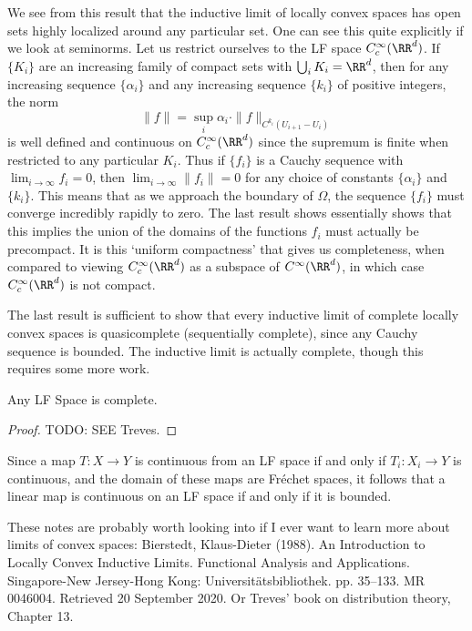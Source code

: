 \begin{remark}
    We see from this result that the inductive limit of locally convex spaces has open sets highly localized around any particular set. One can see this quite explicitly if we look at seminorms. Let us restrict ourselves to the LF space $C_c^\infty(\RR^d)$. If $\{ K_i \}$ are an increasing family of compact sets with $\bigcup_i K_i = \RR^d$, then for any increasing sequence $\{ \alpha_i \}$ and any increasing sequence $\{ k_i \}$ of positive integers, the norm
    \[ \| f \| = \sup_i \alpha_i \cdot \| f \|_{C^{k_i}(U_{i+1} - U_i)} \]
    is well defined and continuous on $C_c^\infty(\RR^d)$ since the supremum is finite when restricted to any particular $K_i$. Thus if $\{ f_i \}$ is a Cauchy sequence with $\lim_{i \to \infty} f_i = 0$, then $\lim_{i \to \infty} \| f_i \| = 0$ for any choice of constants $\{ \alpha_i \}$ and $\{ k_i \}$. This means that as we approach the boundary of $\Omega$, the sequence $\{ f_i \}$ must converge incredibly rapidly to zero. The last result shows essentially shows that this implies the union of the domains of the functions $f_i$ must actually be precompact. It is this `uniform compactness' that gives us completeness, when compared to viewing $C_c^\infty(\RR^d)$ as a subspace of $C^\infty(\RR^d)$, in which case $C_c^\infty(\RR^d)$ is not compact.
\end{remark}

The last result is sufficient to show that every inductive limit of complete locally convex spaces is quasicomplete (sequentially complete), since any Cauchy sequence is bounded. The inductive limit is actually complete, though this requires some more work.

\begin{theorem}
    Any LF Space is complete.
\end{theorem}
\begin{proof}
    TODO: SEE Treves.
\end{proof}

Since a map $T: X \to Y$ is continuous from an LF space if and only if $T_i: X_i \to Y$ is continuous, and the domain of these maps are Fr\'{e}chet spaces, it follows that a linear map is continuous on an LF space if and only if it is bounded.

These notes are probably worth looking into if I ever want to learn more about limits of convex spaces: Bierstedt, Klaus-Dieter (1988). An Introduction to Locally Convex Inductive Limits. Functional Analysis and Applications. Singapore-New Jersey-Hong Kong: Universitätsbibliothek. pp. 35–133. MR 0046004. Retrieved 20 September 2020. Or Treves' book on distribution theory, Chapter 13.





















